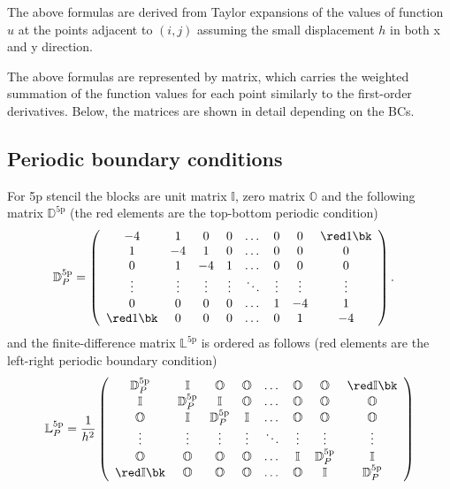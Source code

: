The above formulas are derived from Taylor expansions of the values of function $u$ at the points adjacent to $(i,j)$ assuming the small displacement $h$ in both x and y direction.

The above formulas are represented by matrix, which carries the weighted summation of the function values for each point similarly to the first-order derivatives. Below, the matrices are shown in detail depending on the BCs. 

\subsection{Periodic boundary conditions}
For 5p stencil the blocks are unit matrix $\mathbb{I}$, zero matrix $\mathbb{O}$ and the following matrix $\mathbb{D}^{\mathrm{5p}}$ (the red elements are the top-bottom periodic condition) 
\begin{equation}
	\begin{split}
		\mathbb{D}^{\mathrm{5p}}_P &= \left(\begin{array}{ccccccccc}
			-4 & 1 & 0&0& \dots&0&0 &\red 1\bk\\
			1&-4&1&0&\dots&0&0& 0\\
			0&1&-4&1 &\dots&0&0&0\\
			\vdots&\vdots&\vdots&\vdots&\ddots &\vdots&\vdots&\vdots\\
			0&0&0&0&\dots &1&-4&1 \\
			\red 1\bk&0&0&0&\dots &0&1&-4
		\end{array}\right).
	\end{split}
\end{equation}
and the finite-difference matrix $\mathbb{L}^{\mathrm{5p}}$ is ordered as follows (red elements are the left-right periodic boundary condition)
\begin{equation}
	\mathbb{L}^{\mathrm{5p}}_P = \frac{1}{h^2}\left(\begin{array}{cccccccccc}
		\mathbb{D}^{\mathrm{5p}}_P & \mathbb{I} & \mathbb{O}&\mathbb{O}& \dots&\mathbb{O}&\mathbb{O} &\red \mathbb{I}\bk\\
		\mathbb{I}&\mathbb{D}^{\mathrm{5p}}_P & \mathbb{I} & \mathbb{O}& \dots&\mathbb{O}&\mathbb{O}&\mathbb{O}\\
		\mathbb{O}&\mathbb{I}&\mathbb{D}^{\mathrm{5p}}_P & \mathbb{I} &  \dots&\mathbb{O}&\mathbb{O}&\mathbb{O}\\
		\vdots&\vdots&\vdots&\vdots&\ddots &\vdots&\vdots&\vdots\\
		\mathbb{O}&\mathbb{O}&\mathbb{O}&\mathbb{O}&\dots &\mathbb{I}&\mathbb{D}^{\mathrm{5p}}_P & \mathbb{I} \\
		\red \mathbb{I}\bk&\mathbb{O}&\mathbb{O}&\mathbb{O}&\dots &\mathbb{O}&\mathbb{I}&\mathbb{D}^{\mathrm{5p}}_P
	\end{array}\right)
\end{equation}

